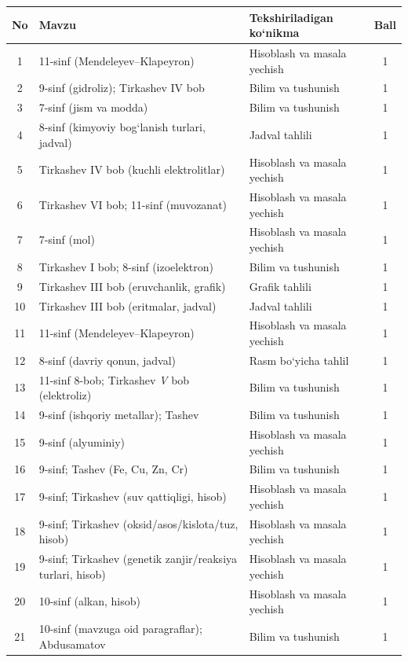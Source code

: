 \documentclass[11pt,a4paper]{article}
\begin{document}
{\small\noindent\begin{longtable}{|c|p{7.2cm}|p{5.4cm}|c|}\hline \textbf{No} & \textbf{Mavzu} & \textbf{Tekshiriladigan ko`nikma} & \textbf{Ball}\\\hline
1 & 11-sinf (Mendeleyev--Klapeyron) & Hisoblash va masala yechish & 1\\\hline
2 & 9-sinf (gidroliz); Tirkashev IV bob & Bilim va tushunish & 1\\\hline
3 & 7-sinf (jism va modda) & Bilim va tushunish & 1\\\hline
4 & 8-sinf (kimyoviy bog`lanish turlari, jadval) & Jadval tahlili & 1\\\hline
5 & Tirkashev IV bob (kuchli elektrolitlar) & Hisoblash va masala yechish & 1\\\hline
6 & Tirkashev VI bob; 11-sinf (muvozanat) & Hisoblash va masala yechish & 1\\\hline
7 & 7-sinf (mol) & Hisoblash va masala yechish & 1\\\hline
8 & Tirkashev I bob; 8-sinf (izoelektron) & Bilim va tushunish & 1\\\hline
9 & Tirkashev III bob (eruvchanlik, grafik) & Grafik tahlili & 1\\\hline
10 & Tirkashev III bob (eritmalar, jadval) & Jadval tahlili & 1\\\hline
11 & 11-sinf (Mendeleyev--Klapeyron) & Hisoblash va masala yechish & 1\\\hline
12 & 8-sinf (davriy qonun, jadval) & Rasm bo`yicha tahlil & 1\\\hline
13 & 11-sinf 8-bob; Tirkashev \textit{V} bob (elektroliz) & Bilim va tushunish & 1\\\hline
14 & 9-sinf (ishqoriy metallar); Tashev & Bilim va tushunish & 1\\\hline
15 & 9-sinf (alyuminiy) & Hisoblash va masala yechish & 1\\\hline
16 & 9-sinf; Tashev (Fe, Cu, Zn, Cr) & Bilim va tushunish & 1\\\hline
17 & 9-sinf; Tirkashev (suv qattiqligi, hisob) & Hisoblash va masala yechish & 1\\\hline
18 & 9-sinf; Tirkashev (oksid/asos/kislota/tuz, hisob) & Hisoblash va masala yechish & 1\\\hline
19 & 9-sinf; Tirkashev (genetik zanjir/reaksiya turlari, hisob) & Hisoblash va masala yechish & 1\\\hline
20 & 10-sinf (alkan, hisob) & Hisoblash va masala yechish & 1\\\hline
21 & 10-sinf (mavzuga oid paragraflar); Abdusamatov & Bilim va tushunish & 1\\\hline

\end{longtable}}
\end{document}
